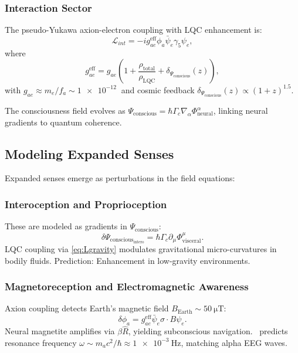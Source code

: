 \documentclass[11pt,a4paper,preprint]{article}
\newcommand{\uqcmf}{\mathrm{UQCMF}}
\newcommand{\Psicon}{\Psi_{\mathrm{conscious}}}
\newcommand{\phia}{\phi_a}
\newcommand{\La}{\mathcal{L}}
\newcommand{\Rhat}{\hat{R}}
\newcommand{\gAe}{g_{ae}^{\mathrm{eff}}}
\newcommand{\rhoLQC}{\rho_{\mathrm{LQC}}}
\begin{document}
\subsubsection{Interaction Sector}
The pseudo-Yukawa axion-electron coupling with LQC enhancement is:
\begin{equation}
    \La_{int} = -i \gAe \phia \bar{\psi}_e \gamma_5 \psi_e,
    \label{eq:Lint}
\end{equation}
where
\begin{equation}
    \gAe = g_{ae} \left(1 + \frac{\rho_{\mathrm{total}}}{\rhoLQC} + \delta_\Psicon(z)\right),
    \label{eq:gaeff}
\end{equation}
with $g_{ae} \approx m_e / f_a \sim \SI{1e-12}{}$ and cosmic feedback $\delta_\Psicon(z) \propto (1+z)^{1.5}$.

The consciousness field evolves as $\Psicon = \hbar \Gamma_c \nabla_\alpha \Phi^\alpha_{\mathrm{neural}}$, linking neural gradients to quantum coherence.

\subsection{Modeling Expanded Senses}

Expanded senses emerge as perturbations in the field equations:

\subsubsection{Interoception and Proprioception}
These are modeled as gradients in $\Psicon$:
\begin{equation}
    \delta \Psicon_{\mathrm{intero}} = \hbar \Gamma_c \partial_\mu \Phi^\mu_{\mathrm{visceral}}.
    \label{eq:intero}
\end{equation}
LQC coupling via \cref{eq:Lgravity} modulates gravitational micro-curvatures in bodily fluids. Prediction: Enhancement in low-gravity environments.

\subsubsection{Magnetoreception and Electromagnetic Awareness}
Axion coupling detects Earth's magnetic field $B_{\mathrm{Earth}} \sim \SI{50}{\micro\tesla}$:
\begin{equation}
    \delta \phia = \gAe \bar{\psi}_e \sigma \cdot B \psi_e.
    \label{eq:magneto}
\end{equation}
Neural magnetite amplifies via $\beta \Rhat$, yielding subconscious navigation. \uqcmf\ predicts resonance frequency $\omega \sim m_a c^2 / \hbar \approx \SI{1e-3}{\hertz}$, matching alpha EEG waves.
\end{document}
